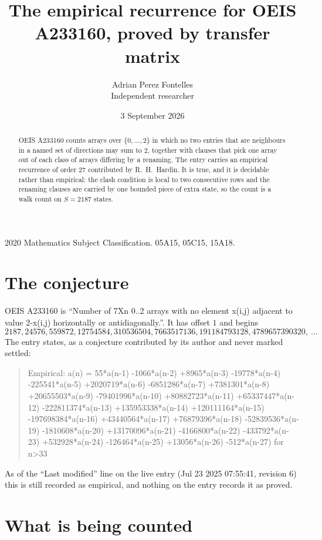 \documentclass[11pt,a4paper]{article}
\title{The empirical recurrence for OEIS A233160, proved by transfer matrix}
\author{Adrian Perez Fontelles\\ \small Independent researcher}
\date{3 September 2026}
\theoremstyle{plain}
\theoremstyle{definition}
\begin{document}
\maketitle

\begin{abstract}
OEIS A233160 counts arrays over $\{0,\dots,2\}$ in which no two entries that are neighbours in
a named set of directions may sum to $2$, together with clauses that pick one array out of
each class of arrays differing by a renaming. The entry carries an empirical recurrence of
order $27$ contributed by R.~H.~Hardin. It is true, and it is decidable rather than
empirical: the clash condition is local to two consecutive rows and the renaming clauses are
carried by one bounded piece of extra state, so the count is a walk count on $S=2187$ states.
\end{abstract}

\noindent\small 2020 Mathematics Subject Classification. 05A15, 05C15, 15A18.\normalsize

\section{The conjecture}

OEIS A233160 is ``Number of 7Xn 0..2 arrays with no element x(i,j) adjacent to value 2-x(i,j) horizontally or antidiagonally.''. It has offset $1$ and begins
\[
2187, 24576, 559872, 12754584, 310536504, 7663517136, 191184793128, 4789657390320,\ \dots
\]
The entry states, as a conjecture contributed by its author and never marked settled:
\begin{quote}
Empirical: a(n) = 55*a(n-1) -1066*a(n-2) +8965*a(n-3) -19778*a(n-4) -225541*a(n-5) +2020719*a(n-6) -6851286*a(n-7) +7381301*a(n-8) +20655503*a(n-9) -79401996*a(n-10) +80882723*a(n-11) +65337447*a(n-12) -222811374*a(n-13) +135953338*a(n-14) +120111164*a(n-15) -197698384*a(n-16) +43440564*a(n-17) +76879396*a(n-18) -52839536*a(n-19) -1810608*a(n-20) +13170096*a(n-21) -4166800*a(n-22) -433792*a(n-23) +532928*a(n-24) -126464*a(n-25) +13056*a(n-26) -512*a(n-27) for n>33
\end{quote}
As of the ``Last modified'' line on the live entry (Jul 23 2025 07:55:41, revision 6) this is still
recorded as empirical, and nothing on the entry records it as proved.

\section{What is being counted}
\end{document}
